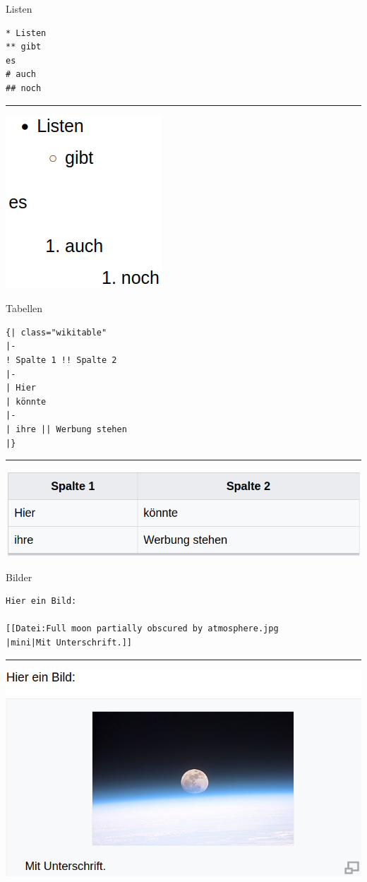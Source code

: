 \documentclass[9pt]{beamer}
\begin{document}
	\begin{frame}[fragile]{Listen}
		\begin{verbatim}
* Listen
** gibt
es
# auch
## noch
		\end{verbatim}
		\hrule\n
		\includegraphics[scale=0.35]{images/wikitext-example-4-lists.png}
	\end{frame}

	\begin{frame}[fragile]{Tabellen}
		\footnotesize
		\begin{verbatim}
{| class="wikitable"
|-
! Spalte 1 !! Spalte 2
|-
| Hier
| könnte
|-
| ihre || Werbung stehen
|}
		\end{verbatim}
		\hrule\n
		\includegraphics[scale=0.35]{images/wikitext-example-5-table.png}
	\end{frame}

	\begin{frame}[fragile]{Bilder}
		\begin{verbatim}
Hier ein Bild:

[[Datei:Full moon partially obscured by atmosphere.jpg
|mini|Mit Unterschrift.]]
		\end{verbatim}
		\hrule\n
		\includegraphics[scale=0.35]{images/wikitext-example-6-image.png}
	\end{frame}
	
\end{document}
